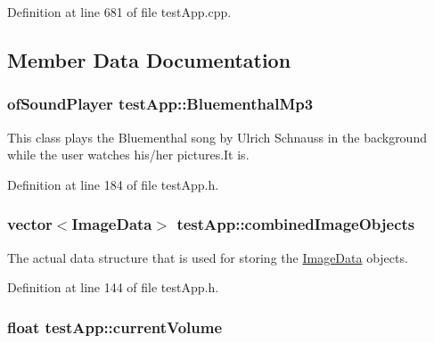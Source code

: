 Definition at line 681 of file test\-App.\-cpp.



\subsection{Member Data Documentation}
\hypertarget{classtest_app_af696fd13ee9ecb38ac0ba0b72543ce06}{
\subsubsection[{Bluementhal\-Mp3}]{\setlength{\rightskip}{0pt plus 5cm}of\-Sound\-Player test\-App\-::\-Bluementhal\-Mp3}}\label{classtest_app_af696fd13ee9ecb38ac0ba0b72543ce06}


This class plays the Bluementhal song by Ulrich Schnauss in the background while the user watches his/her pictures.\-It is. 



Definition at line 184 of file test\-App.\-h.

\hypertarget{classtest_app_aced9b8a8419c8465877c2c9cd43f8934}{
\subsubsection[{combined\-Image\-Objects}]{\setlength{\rightskip}{0pt plus 5cm}vector$<${\bf Image\-Data}$>$ test\-App\-::combined\-Image\-Objects}}\label{classtest_app_aced9b8a8419c8465877c2c9cd43f8934}


The actual data structure that is used for storing the \hyperlink{struct_image_data}{Image\-Data} objects. 



Definition at line 144 of file test\-App.\-h.

\hypertarget{classtest_app_a51c20c5432d9f6b06f719526d9a34ee6}{
\subsubsection[{current\-Volume}]{\setlength{\rightskip}{0pt plus 5cm}float test\-App\-::current\-Volume}}\label{classtest_app_a51c20c5432d9f6b06f719526d9a34ee6}


